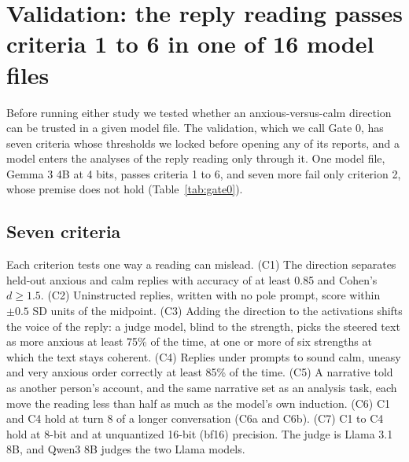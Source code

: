 \section{Validation: the reply reading passes criteria 1 to 6 in one of 16 model files}
\label{sec:gate0}

Before running either study we tested whether an anxious-versus-calm direction can be trusted in a
given model file.
The validation, which we call Gate 0, has seven criteria whose thresholds we locked before opening
any of its reports, and a model enters the analyses of the reply reading only through it.
One model file, Gemma 3 4B at 4 bits, passes criteria 1 to 6, and seven more fail only criterion 2,
whose premise does not hold (Table~\ref{tab:gate0}).

\subsection{Seven criteria}
Each criterion tests one way a reading can mislead.
(C1) The direction separates held-out anxious and calm replies with accuracy of at least 0.85 and
Cohen's $d \geq 1.5$.
(C2) Uninstructed replies, written with no pole prompt, score within $\pm 0.5$ SD units of the midpoint.
(C3) Adding the direction to the activations shifts the voice of the reply: a judge model, blind to
the strength, picks the steered text as more anxious at least 75\% of the time, at one or more of six
strengths at which the text stays coherent.
(C4) Replies under prompts to sound calm, uneasy and very anxious order correctly at least 85\% of the time.
(C5) A narrative told as another person's account, and the same narrative set as an analysis task,
each move the reading less than half as much as the model's own induction.
(C6) C1 and C4 hold at turn 8 of a longer conversation (C6a and C6b).
(C7) C1 to C4 hold at 8-bit and at unquantized 16-bit (bf16) precision.
The judge is Llama 3.1 8B, and Qwen3 8B judges the two Llama models.

